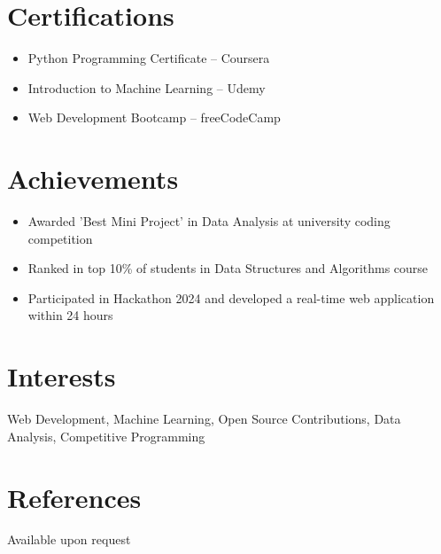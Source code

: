 \documentclass[a4paper,10pt]{article}
\begin{document}
\section*{Certifications}
\begin{itemize}[leftmargin=0.5cm]
    \item Python Programming Certificate -- Coursera
    \item Introduction to Machine Learning -- Udemy
    \item Web Development Bootcamp -- freeCodeCamp
\end{itemize}

\section*{Achievements}
\begin{itemize}[leftmargin=0.5cm]
    \item Awarded 'Best Mini Project' in Data Analysis at university coding competition
    \item Ranked in top 10\% of students in Data Structures and Algorithms course
    \item Participated in Hackathon 2024 and developed a real-time web application within 24 hours
\end{itemize}

\section*{Interests}
Web Development, Machine Learning, Open Source Contributions, Data Analysis, Competitive Programming

\section*{References}
Available upon request
\end{document}

